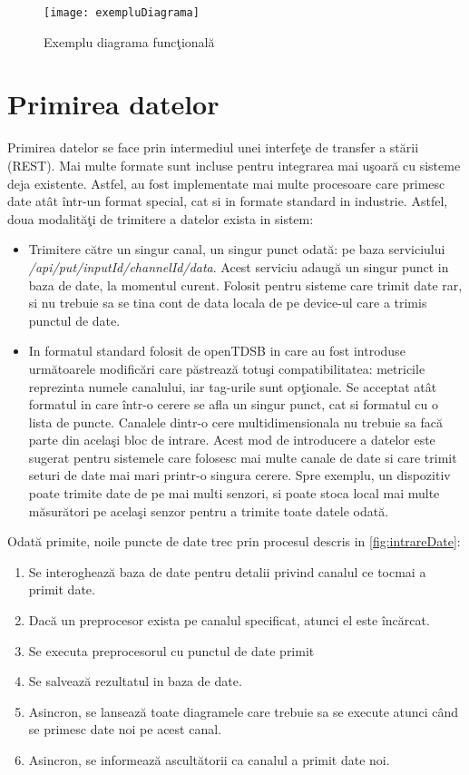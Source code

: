 \begin{figure}[H]
	\centering
	\texttt{[image: exempluDiagrama]}
	\caption{Exemplu diagrama funcţională}
	\label{fig:exempluDiagrama}
\end{figure}

\section{Primirea datelor}
Primirea datelor se face prin intermediul unei interfeţe de transfer a stării (REST). Mai multe formate sunt incluse pentru integrarea mai uşoară cu sisteme deja existente. Astfel, au fost implementate mai multe procesoare care primesc date atât într-un format special, cat si in formate standard in industrie.
Astfel, doua modalităţi de trimitere a datelor exista in sistem:
\begin{itemize}
	\item Trimitere către un singur canal, un singur punct odată: pe baza serviciului\\ \textit{/api/put/{inputId}/{channelId}/{data}}. Acest serviciu adaugă un singur punct in baza de date, la momentul curent. Folosit pentru sisteme care trimit date rar, si nu trebuie sa se tina cont de data locala de pe device-ul care a trimis punctul de date.
	\item In formatul standard folosit de openTDSB in care au fost introduse următoarele modificări care păstrează totuşi compatibilitatea: metricile reprezinta numele canalului, iar tag-urile sunt opţionale. Se acceptat atât formatul in care într-o cerere se afla un singur punct, cat si formatul cu o lista de puncte. Canalele dintr-o cere multidimensionala nu trebuie sa facă parte din acelaşi bloc de intrare. Acest mod de introducere a datelor este sugerat pentru sistemele care folosesc mai multe canale de date si care trimit seturi de date mai mari printr-o singura cerere. Spre exemplu, un dispozitiv poate trimite date de pe mai multi senzori, si poate stoca local mai multe măsurători pe acelaşi senzor pentru a trimite toate datele odată.
\end{itemize}
Odată primite, noile puncte de date trec prin procesul descris in \cref{fig:intrareDate}:
\begin{enumerate}
	\item Se interoghează baza de date pentru detalii privind canalul ce tocmai a primit date.
	\item Dacă un preprocesor exista pe canalul specificat, atunci el este încărcat.
	\item Se executa preprocesorul cu punctul de date primit
	\item Se salvează rezultatul in baza de date.
	\item Asincron, se lansează toate diagramele care trebuie sa se execute atunci când se primesc date noi pe acest canal.
	\item Asincron, se informează ascultătorii ca canalul a primit date noi.
\end{enumerate}
